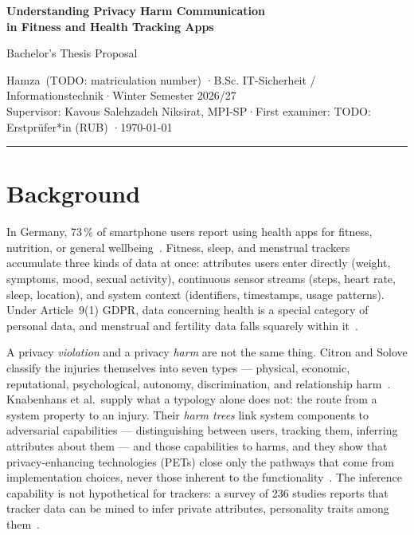 \documentclass[10pt,a4paper]{article}
\newcommand{\authorname}{Hamza}
\newcommand{\matriculation}{TODO: matriculation number}
\newcommand{\firstexaminer}{TODO: Erstprüfer*in (RUB)}
\newcommand{\supervisorname}{Kavous Salehzadeh Niksirat, MPI-SP}
\newcommand{\theprogram}{B.Sc. IT-Sicherheit / Informationstechnik}
\newcommand{\thesemester}{Winter Semester 2026/27}
\begin{document}
\begin{center}
  {\large\bfseries Understanding Privacy Harm Communication\\
   in Fitness and Health Tracking Apps\par}
  \vspace{0.35em}
  {\normalsize Bachelor's Thesis Proposal\par}
  \vspace{0.5em}
  {\footnotesize
   \authorname\ (\matriculation) \quad·\quad \theprogram \quad·\quad \thesemester\\
   Supervisor: \supervisorname \quad·\quad First examiner: \firstexaminer
   \quad·\quad \today\par}
\end{center}
\vspace{0.4em}
\hrule
\vspace{0.9em}

\section{Background}

In Germany, 73\,\% of smartphone users report using health apps for fitness,
nutrition, or general wellbeing~\parencite{bitkom2025health}. Fitness, sleep,
and menstrual trackers accumulate three kinds of data at once: attributes users
enter directly (weight, symptoms, mood, sexual activity), continuous sensor
streams (steps, heart rate, sleep, location), and system context (identifiers,
timestamps, usage patterns). Under Article~9(1) GDPR, data concerning health is
a special category of personal data, and menstrual and fertility data falls
squarely within it~\parencite{gdpr2016}.

A privacy \emph{violation} and a privacy \emph{harm} are not the same thing.
Citron and Solove classify the injuries themselves into seven types --- physical,
economic, reputational, psychological, autonomy, discrimination, and
relationship harm~\parencite[830--861]{citron2021harms}. Knabenhans et al.\
supply what a typology alone does not: the route from a system property to an
injury. Their \emph{harm trees} link system components to adversarial
capabilities --- distinguishing between users, tracking them, inferring
attributes about them --- and those capabilities to harms, and they show that
privacy-enhancing technologies (PETs) close only the pathways that come from
implementation choices, never those inherent to the
functionality~\parencite{knabenhans2026harms}. The inference capability is not
hypothetical for trackers: a survey of 236 studies reports that tracker data can
be mined to infer private attributes, personality traits among
them~\parencite{niksirat2024wearable}.
\end{document}
